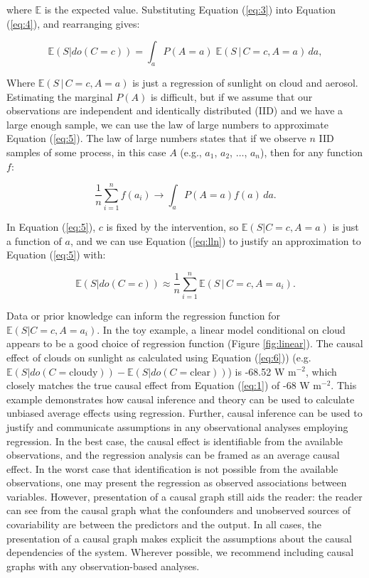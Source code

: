 \documentclass[12pt]{article}
\begin{document}
where $\mathbb{E}$ is the expected value. Substituting Equation
(\ref{eq:3}) into Equation (\ref{eq:4}), and rearranging gives:

\begin{equation}
  \mathbb{E}(S | do(C = c))  = \int_{a} P(A=a) \; \mathbb{E}(S \, | \,
  C=c, A=a) \, d a,
  \label{eq:5}
\end{equation}

Where $\mathbb{E}(S \, | \, C=c, A=a)$ is just a regression of sunlight on
cloud and aerosol. Estimating the marginal $P(A)$ is difficult, but
if we assume that our observations are independent and identically
distributed (IID) and we have a large enough sample, we can use the
law of large numbers to approximate Equation (\ref{eq:5}). The law of
large numbers states that if we observe $n$ IID samples of some process, in
this case $A$ (e.g., $a_1$, $a_2$, $\ldots$, $a_n$), then for any
function $f$:

\begin{equation}
  \frac{1}{n} \sum_{i=1}^n f(a_i) \to \int_a P(A=a) f(a) \, d a.
  \label{eq:lln}
\end{equation}

In Equation (\ref{eq:5}), $c$ is fixed by the intervention, so
$\mathbb{E}(S| C=c, A=a)$ is just a function of $a$, and we can use
Equation (\ref{eq:lln}) to justify an approximation to Equation
(\ref{eq:5}) with:

\begin{equation}
  \mathbb{E}(S | do(C = c))  \approx \frac{1}{n} \sum_{i=1}^n
  \mathbb{E}(S \, | \,
  C=c, A=a_i).
  \label{eq:6}
\end{equation}

Data or prior knowledge can inform the regression function for
$\mathbb{E}(S | C=c, A=a_i)$. In the toy example, a linear model
conditional on cloud appears to be a good choice of regression
function (Figure \ref{fig:linear}). The causal effect of clouds on
sunlight as calculated using Equation (\ref{eq:6})) (e.g.
$\mathbb{E}(S | do(C = \text{cloudy})) - \mathbb{E}(S | do(C =
\text{clear}))$) is -68.52 W m$^{-2}$, which closely matches the true
causal effect from Equation (\ref{eq:1}) of -68 W m$^{-2}$. This
example demonstrates how causal inference and theory can be used to
calculate unbiased average effects using regression. Further, causal
inference can be used to justify and communicate assumptions in any
observational analyses employing regression. In the best case, the
causal effect is identifiable from the available observations, and the
regression analysis can be framed as an average causal effect. In the
worst case that identification is not possible from the available
observations, one may present the regression as observed associations
between variables. However, presentation of a causal graph still aids
the reader: the reader can see from the causal graph what the
confounders and unobserved sources of covariability are between the
predictors and the output. In all cases, the presentation of a causal
graph makes explicit the assumptions about the causal dependencies of
the system. Wherever possible, we recommend including causal graphs
with any observation-based analyses.
\end{document}
